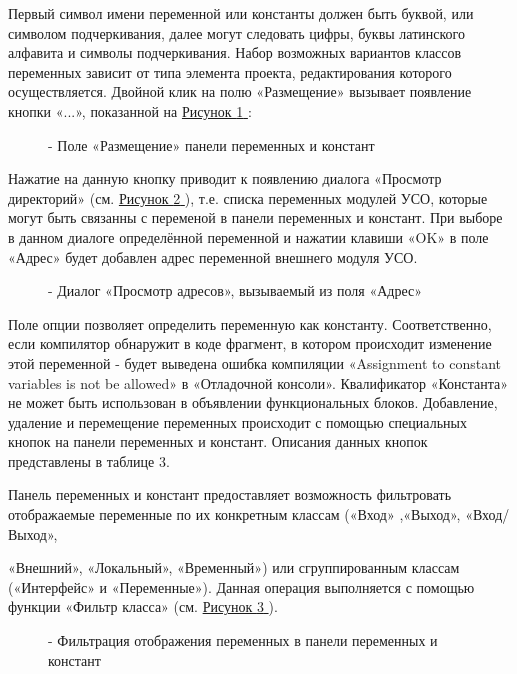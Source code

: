 \documentclass[letterpaper,10pt,russian]{sphinxmanual}
\begin{document}
Первый символ имени переменной или константы должен быть буквой, или
символом подчеркивания, далее могут следовать цифры, буквы латинского
алфавита и символы подчеркивания. Набор возможных вариантов классов
переменных зависит от типа элемента проекта, редактирования которого
осуществляется. Двойной клик на полю «Размещение» вызывает появление
кнопки «...», показанной на \hyperref[usage_guide/ide_components:image33]{Рисунок \ref{usage_guide/ide_components:image33} }:
\begin{figure}[htbp]
\centering
\capstart

\noindent{}
\caption{- Поле «Размещение» панели переменных и констант}\label{usage_guide/ide_components:image33}\end{figure}

Нажатие на данную кнопку приводит к появлению диалога «Просмотр
директорий» (см. \hyperref[usage_guide/ide_components:image34]{Рисунок \ref{usage_guide/ide_components:image34} }), т.е. списка переменных модулей УСО, которые
могут быть связанны с переменой в панели переменных и констант. При
выборе в данном диалоге определённой переменной и нажатии клавиши «OK» в
поле «Адрес» будет добавлен адрес переменной внешнего модуля УСО.
\begin{figure}[htbp]
\centering
\capstart

\noindent{}
\caption{- Диалог «Просмотр адресов», вызываемый из поля «Адрес»}\label{usage_guide/ide_components:image34}\end{figure}

Поле опции позволяет определить переменную как константу.
Соответственно, если компилятор обнаружит в коде фрагмент, в котором
происходит изменение этой переменной - будет выведена ошибка компиляции
«Assignment to constant variables is not be allowed» в «Отладочной
консоли». Квалификатор «Константа» не может быть использован в
объявлении функциональных блоков. Добавление, удаление и перемещение
переменных происходит с помощью специальных кнопок на панели переменных
и констант. Описания данных кнопок представлены в таблице 3.

Панель переменных и констант предоставляет возможность фильтровать
отображаемые переменные по их конкретным классам («Вход» ,«Выход»,
«Вход/Выход»,

«Внешний», «Локальный», «Временный») или сгруппированным классам
(«Интерфейс» и «Переменные»). Данная операция выполняется с помощью
функции «Фильтр класса» (см. \hyperref[usage_guide/ide_components:image35]{Рисунок \ref{usage_guide/ide_components:image35} }).
\begin{figure}[htbp]
\centering
\capstart

\noindent{}
\caption{- Фильтрация отображения переменных в панели переменных и констант}\label{usage_guide/ide_components:image35}\end{figure}
\end{document}
